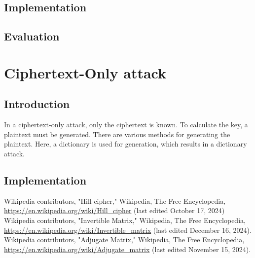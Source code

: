 \documentclass[conference]{IEEEtran}
\begin{document}
\subsection{Implementation}
\subsection{Evaluation}
\section{Ciphertext-Only attack}
\subsection{Introduction}
In a ciphertext-only attack, only the ciphertext is known. To calculate the key, a plaintext must be generated. There are various methods for generating the plaintext. Here, a dictionary is used for generation, which results in a dictionary attack.
\subsection{Implementation}

\begin{thebibliography}{9}
 Wikipedia contributors, "Hill cipher," Wikipedia, The Free Encyclopedia, \url{https://en.wikipedia.org/wiki/Hill_cipher} (last edited October 17, 2024)
 Wikipedia contributors, "Invertible Matrix," Wikipedia, The Free Encyclopedia, \url{https://en.wikipedia.org/wiki/Invertible_matrix} (last edited December 16, 2024).
  Wikipedia contributors, "Adjugate Matrix," Wikipedia, The Free Encyclopedia, \url{https://en.wikipedia.org/wiki/Adjugate_matrix} (last edited November 15, 2024).
\end{thebibliography}
\end{document}
